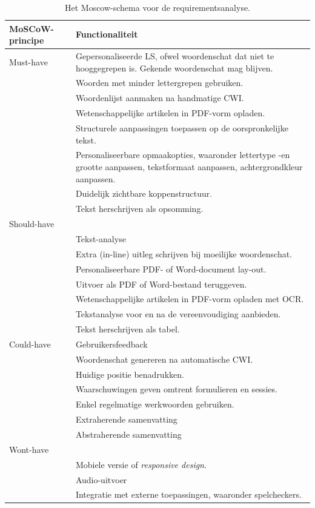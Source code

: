 \begin{center}
	\begin{table}[H]
		\begin{tabular}{ | m{4cm} | m{11cm} | } 
			\hline
			\textbf{MoSCoW-principe} & \textbf{Functionaliteit} \\
			\hline
			Must-have & Gepersonaliseerde LS, ofwel woordenschat dat niet te hooggegrepen is. Gekende woordenschat mag blijven. \\
			& Woorden met minder lettergrepen gebruiken. \\
			& Woordenlijst aanmaken na handmatige CWI. \\
			& Wetenschappelijke artikelen in PDF-vorm opladen. \\
			& Structurele aanpassingen toepassen op de oorspronkelijke tekst. \\
			& Personaliseerbare opmaakopties, waaronder lettertype -en grootte aanpassen, tekstformaat aanpassen, achtergrondkleur aanpassen. \\
			& Duidelijk zichtbare koppenstructuur. \\
			& Tekst herschrijven als opsomming. \\
			\hline
			Should-have & \\
			& Tekst-analyse \\
			& Extra (in-line) uitleg schrijven bij moeilijke woordenschat. \\
			& Personaliseerbare PDF- of Word-document lay-out. \\
			& Uitvoer als PDF of Word-bestand teruggeven. \\
			& Wetenschappelijke artikelen in PDF-vorm opladen met OCR. \\
			& Tekstanalyse voor en na de vereenvoudiging aanbieden. \\
			& Tekst herschrijven als tabel. \\
			\hline
			Could-have 
			& Gebruikersfeedback \\
			& Woordenschat genereren na automatische CWI. \\
			& Huidige positie benadrukken. \\
			& Waarschuwingen geven omtrent formulieren en sessies. \\
			& Enkel regelmatige werkwoorden gebruiken. \\
			& Extraherende samenvatting \\
			& Abstraherende samenvatting \\
			\hline
			Wont-have & \\
			& Mobiele versie of \textit{responsive design}. \\
			& Audio-uitvoer \\
			& Integratie met externe toepassingen, waaronder spelcheckers. \\
			\hline
		\end{tabular}
		\caption{Het Moscow-schema voor de requirementsanalyse.}
		\label{img:moscow-table}
	\end{table}
\end{center}

